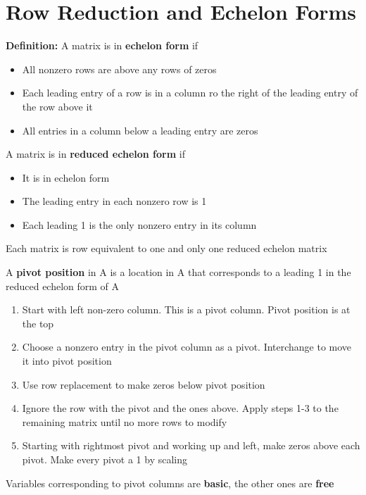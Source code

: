\documentclass{report}
\begin{document}
\section{Row Reduction and Echelon Forms}
\textbf{Definition:} A matrix is in \textbf{echelon form} if
\begin{itemize}
    \item All nonzero rows are above any rows of zeros
    \item Each leading entry of a row is in a column ro the right of the leading entry of the row above it
    \item All entries in a column below a leading entry are zeros
\end{itemize}
A matrix is in \textbf{reduced echelon form} if
\begin{itemize}
    \item It is in echelon form
    \item The leading entry in each nonzero row is 1
    \item Each leading 1 is the only nonzero entry in its column
\end{itemize}
\begin{theorem}
    Each matrix is row equivalent to one and only one reduced echelon matrix
\end{theorem}
\begin{definition}
    A \textbf{pivot position} in A is a location in A that corresponds to a leading 1
    in the reduced echelon form of A
\end{definition}
\begin{tcolorbox}[colback=blue!5!white, colframe=blue!75!black, title=Row Reduction Algorithm]
\begin{enumerate}
    \item Start with left non-zero column. This is a pivot column. Pivot position is at the top
    \item Choose a nonzero entry in the pivot column as a pivot. Interchange to move it into pivot position
    \item Use row replacement to make zeros below pivot position
    \item Ignore the row with the pivot and the ones above. Apply steps 1-3 to the remaining matrix until no more rows to modify
    \item Starting with rightmost pivot and working up and left, make zeros above each pivot. Make every pivot a 1 by scaling
\end{enumerate}
\end{tcolorbox}
Variables corresponding to pivot columns are \textbf{basic}, the other ones are \textbf{free}
\begin{theorem}
\end{theorem}
\end{document}
